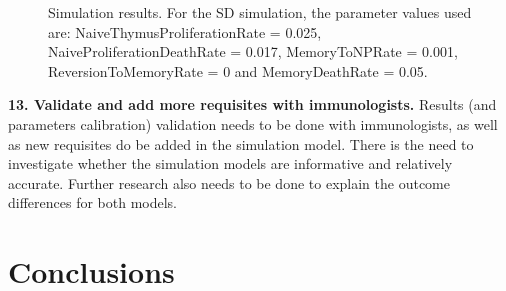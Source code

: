 \documentclass{llncs}
\begin{document}
\begin{figure}[!htpb]
\vspace{-20pt}
 \begin{center}
 \end{center}
 \label{fig:Conceptual}
 \vspace{-25pt}
 \caption{{\small Simulation results. For the SD simulation, the parameter values used are: NaiveThymusProliferationRate = 0.025, NaiveProliferationDeathRate = 0.017, MemoryToNPRate = 0.001, ReversionToMemoryRate = 0 and MemoryDeathRate = 0.05.}}
 \vspace{-20pt}
\end{figure}


{\bf 13. Validate and add more requisites with immunologists.} Results (and parameters calibration) validation needs to be done with immunologists, as well as new requisites do be added in the simulation model. There is the need to investigate whether the simulation models are informative and relatively accurate. Further research also needs to be done to explain the outcome differences for both models.

\section{Conclusions}
\label{Conclusions}
\end{document}
